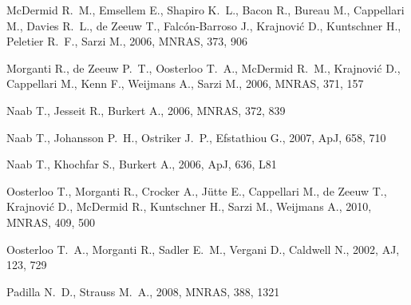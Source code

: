 \documentclass[usenatbib,usegraphicx]{mn2e}
\def\aj{AJ}             %
\def\apj{ApJ}           %
\def\apjl{ApJ}          %
\def\mnras{MNRAS}       %
\begin{document}
\begin{thebibliography}{}
{McDermid} R.~M.,  {Emsellem} E.,  {Shapiro} K.~L.,  {Bacon} R.,  {Bureau} M.,
  {Cappellari} M.,  {Davies} R.~L.,  {de Zeeuw} T.,  {Falc{\'o}n-Barroso} J.,
  {Krajnovi{\'c}} D.,  {Kuntschner} H.,  {Peletier} R.~F.,    {Sarzi} M.,
  2006, \mnras, 373, 906

{Morganti} R.,  {de Zeeuw} P.~T.,  {Oosterloo} T.~A.,  {McDermid} R.~M.,
  {Krajnovi{\'c}} D.,  {Cappellari} M.,  {Kenn} F.,  {Weijmans} A.,    {Sarzi}
  M.,  2006, \mnras, 371, 157

{Naab} T.,  {Jesseit} R.,    {Burkert} A.,  2006, \mnras, 372, 839

{Naab} T.,  {Johansson} P.~H.,  {Ostriker} J.~P.,    {Efstathiou} G.,  2007,
  \apj, 658, 710

{Naab} T.,  {Khochfar} S.,    {Burkert} A.,  2006, \apjl, 636, L81

{Oosterloo} T.,  {Morganti} R.,  {Crocker} A.,  {J{\"u}tte} E.,  {Cappellari}
  M.,  {de Zeeuw} T.,  {Krajnovi{\'c}} D.,  {McDermid} R.,  {Kuntschner} H.,
  {Sarzi} M.,    {Weijmans} A.,  2010, \mnras, 409, 500

{Oosterloo} T.~A.,  {Morganti} R.,  {Sadler} E.~M.,  {Vergani} D.,
  {Caldwell} N.,  2002, \aj, 123, 729

{Padilla} N.~D.,  {Strauss} M.~A.,  2008, \mnras, 388, 1321


\end{thebibliography}
\end{document}
